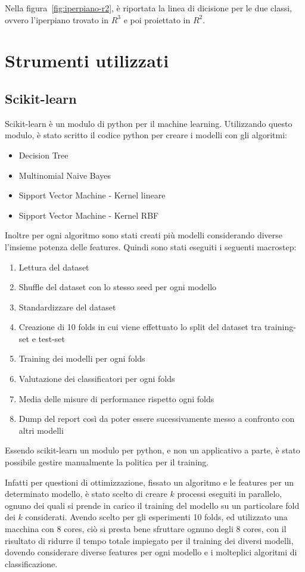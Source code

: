 \documentclass[oneside]{book}
\begin{document}
\noindent
Nella figura~\ref{fig:iperpiano-r2}, è riportata la linea di dicisione per le due classi, ovvero l'iperpiano trovato in $R^3$ e poi proiettato in $R^2$.

\newpage
\section{Strumenti utilizzati}
\subsection{Scikit-learn}

Scikit-learn è un modulo di python per il machine learning. Utilizzando questo modulo, è stato scritto il codice python per creare i modelli con gli algoritmi:
\begin{itemize}
	\item Decision Tree
	\item Multinomial Naive Bayes
	\item Sipport Vector Machine - Kernel lineare
	\item Sipport Vector Machine - Kernel RBF
\end{itemize}
Inoltre per ogni algoritmo sono stati creati più modelli considerando diverse l'insieme potenza delle features. Quindi sono stati eseguiti i seguenti macrostep:
\begin{enumerate}
	\item Lettura del dataset
	\item Shuffle del dataset con lo stesso seed per ogni modello
	\item Standardizzare del dataset
	\item Creazione di 10 folds in cui viene effettuato lo split del dataset tra training-set e test-set
	\item Training dei modelli per ogni folds
	\item Valutazione dei classificatori per ogni folds
	\item Media delle misure di performance rispetto ogni folds
	\item Dump del report così da poter essere sucessivamente messo a confronto con altri modelli
\end{enumerate}
Essendo scikit-learn un modulo per python, e non un applicativo a parte, è stato possibile gestire manualmente la politica per il training.

Infatti per questioni di ottimizzazione, fissato un algoritmo e le features per un determinato modello, è stato scelto di creare $k$ processi eseguiti in parallelo, ognuno dei quali si prende in carico il training del modello su un particolare fold dei $k$ considerati. Avendo scelto per gli esperimenti 10 folds, ed utilizzato una macchina con 8 cores, ciò si presta bene sfruttare ognuno degli 8 cores, con il risultato di ridurre il tempo totale impiegato per il training dei diversi modelli, dovendo considerare diverse features per ogni modello e i molteplici algoritmi di classificazione.
\end{document}
